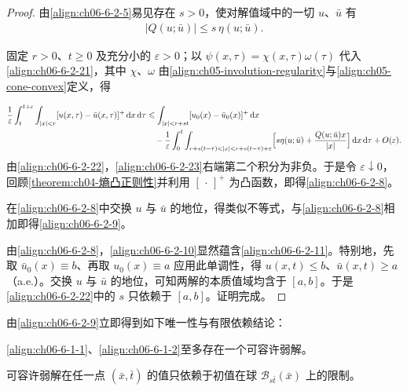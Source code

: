 \documentclass[../../main.tex]{subfiles}
\begin{document}
\begin{proof}
由\eqref{align:ch06-6-2-5}易见存在 $s>0$，使对解值域中的一切 $u$、$\bar{u}$ 有
\begin{align}
|Q(u;\bar{u})|\leqslant s\,\eta(u;\bar{u}).
\label{align:ch06-6-2-22}
\end{align}

固定 $r>0$、$t\geqslant 0$ 及充分小的 $\varepsilon>0$；以 $\psi(x,\tau)=\chi(x,\tau)\omega(\tau)$ 代入\eqref{align:ch06-6-2-21}，其中 $\chi$、$\omega$ 由\eqref{align:ch05-involution-regularity}与\eqref{align:ch05-cone-convex}定义，得

\begin{align}
\frac{1}{\varepsilon}\int_{t}^{t+\varepsilon}\int_{|x|<r}[u(x,\tau)-\bar{u}(x,\tau)]^{+}\,\mathrm{d}x\,\mathrm{d}\tau
&\leqslant\int_{|x|<r+st}[u_{0}(x)-\bar{u}_{0}(x)]^{+}\,\mathrm{d}x\notag\\
&\quad-\frac{1}{\varepsilon}\int_{0}^{t}\int_{r+s(t-\tau)<|x|<r+s(t-\tau)+\varepsilon}\Bigl{[}s\eta(u;\bar{u})+\frac{Q(u;\bar{u})x}{|x|}\Bigr{]}\,\mathrm{d}x\,\mathrm{d}\tau+O(\varepsilon).
\label{align:ch06-6-2-23}
\end{align}
由\eqref{align:ch06-6-2-22}，\eqref{align:ch06-6-2-23}右端第二个积分为非负。于是令 $\varepsilon\downarrow 0$，回顾\cref{theorem:ch04-熵凸正则性}并利用 $[\,\cdot\,]^{+}$ 为凸函数，即得\eqref{align:ch06-6-2-8}。


在\eqref{align:ch06-6-2-8}中交换 $u$ 与 $\bar{u}$ 的地位，得类似不等式，与\eqref{align:ch06-6-2-8}相加即得\eqref{align:ch06-6-2-9}。

由\eqref{align:ch06-6-2-8}，\eqref{align:ch06-6-2-10}显然蕴含\eqref{align:ch06-6-2-11}。特别地，先取 $\bar{u}_{0}(x)\equiv b$、再取 $u_{0}(x)\equiv a$ 应用此单调性，得 $u(x,t)\leqslant b$、$\bar{u}(x,t)\geqslant a$（a.e.）。交换 $u$ 与 $\bar{u}$ 的地位，可知两解的本质值域均含于 $[a,b]$。于是\eqref{align:ch06-6-2-22}中的 $s$ 只依赖于 $[a,b]$。证明完成。
\end{proof}

由\eqref{align:ch06-6-2-9}立即得到如下唯一性与有限依赖结论：

\begin{corollary}\label{corollary:ch06-6-2-4}
\eqref{align:ch06-6-1-1}、\eqref{align:ch06-6-1-2}至多存在一个可容许弱解。
\end{corollary}

\begin{corollary}\label{corollary:ch06-6-2-5}
可容许弱解在任一点 $(\bar{x},\bar{t})$ 的值只依赖于初值在球 $\mathscr{B}_{s\bar{t}}(\bar{x})$ 上的限制。
\end{corollary}
\end{document}
